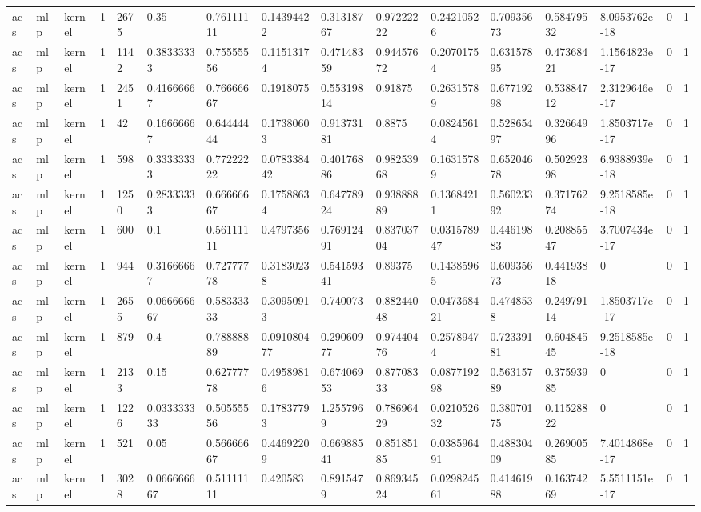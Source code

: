 \begin{tabular}{llllllllllllllll}
acs & mlp & kernel & 1 & 2675 & 0.35 & 0.76111111 & 0.14394422 & 0.31318767 & 0.97222222 & 0.24210526 & 0.70935673 & 0.58479532 & 8.0953762e-18 & 0 & 1 \\
acs & mlp & kernel & 1 & 1142 & 0.38333333 & 0.75555556 & 0.11513174 & 0.47148359 & 0.94457672 & 0.20701754 & 0.63157895 & 0.47368421 & 1.1564823e-17 & 0 & 1 \\
acs & mlp & kernel & 1 & 2451 & 0.41666667 & 0.76666667 & 0.1918075 & 0.55319814 & 0.91875 & 0.26315789 & 0.67719298 & 0.53884712 & 2.3129646e-17 & 0 & 1 \\
acs & mlp & kernel & 1 & 42 & 0.16666667 & 0.64444444 & 0.17380603 & 0.91373181 & 0.8875 & 0.08245614 & 0.52865497 & 0.32664996 & 1.8503717e-17 & 0 & 1 \\
acs & mlp & kernel & 1 & 598 & 0.33333333 & 0.77222222 & 0.078338442 & 0.40176886 & 0.98253968 & 0.16315789 & 0.65204678 & 0.50292398 & 6.9388939e-18 & 0 & 1 \\
acs & mlp & kernel & 1 & 1250 & 0.28333333 & 0.66666667 & 0.17588634 & 0.64778924 & 0.93888889 & 0.13684211 & 0.56023392 & 0.37176274 & 9.2518585e-18 & 0 & 1 \\
acs & mlp & kernel & 1 & 600 & 0.1 & 0.56111111 & 0.4797356 & 0.76912491 & 0.83703704 & 0.031578947 & 0.44619883 & 0.20885547 & 3.7007434e-17 & 0 & 1 \\
acs & mlp & kernel & 1 & 944 & 0.31666667 & 0.72777778 & 0.31830238 & 0.54159341 & 0.89375 & 0.14385965 & 0.60935673 & 0.44193818 & 0 & 0 & 1 \\
acs & mlp & kernel & 1 & 2655 & 0.066666667 & 0.58333333 & 0.30950913 & 0.740073 & 0.88244048 & 0.047368421 & 0.4748538 & 0.24979114 & 1.8503717e-17 & 0 & 1 \\
acs & mlp & kernel & 1 & 879 & 0.4 & 0.78888889 & 0.091080477 & 0.29060977 & 0.97440476 & 0.25789474 & 0.72339181 & 0.60484545 & 9.2518585e-18 & 0 & 1 \\
acs & mlp & kernel & 1 & 2133 & 0.15 & 0.62777778 & 0.49589816 & 0.67406953 & 0.87708333 & 0.087719298 & 0.56315789 & 0.37593985 & 0 & 0 & 1 \\
acs & mlp & kernel & 1 & 1226 & 0.033333333 & 0.50555556 & 0.17837793 & 1.2557969 & 0.78696429 & 0.021052632 & 0.38070175 & 0.11528822 & 0 & 0 & 1 \\
acs & mlp & kernel & 1 & 521 & 0.05 & 0.56666667 & 0.44692209 & 0.66988541 & 0.85185185 & 0.038596491 & 0.48830409 & 0.26900585 & 7.4014868e-17 & 0 & 1 \\
acs & mlp & kernel & 1 & 3028 & 0.066666667 & 0.51111111 & 0.420583 & 0.8915479 & 0.86934524 & 0.029824561 & 0.41461988 & 0.16374269 & 5.5511151e-17 & 0 & 1 \\

\end{tabular}
